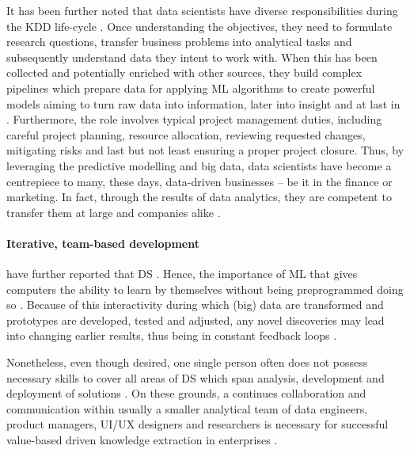 It has been further noted that data scientists have diverse responsibilities during the \ac{KDD} life-cycle \parencite{CaoLong2017}.
Once understanding the objectives, they need to formulate research questions, transfer business problems into analytical tasks and subsequently understand data they intent to work with. 
When this has been collected and potentially enriched with other sources, they build complex pipelines which prepare data for applying \ac{ML} algorithms to create powerful models aiming to turn raw data into information, later into insight and at last in  \parencites{GoebelMichGru1999}[30]{CaoLong2017}.
Furthermore, the role involves typical project management duties, including careful project planning, resource allocation, reviewing requested changes,  mitigating risks and last but not least ensuring a proper project closure.
Thus, by leveraging the predictive modelling and big data, data scientists have become a centrepiece to many, these days, data-driven businesses -- be it in the finance or marketing. 
In fact, through the results of data analytics, they are competent to transfer them  at large and companies alike \parencites{Dhar:2013:DSP:2534706.2500499}[6]{Carbone2016ChallengesPerspective}.

\paragraph*{Iterative, team-based development}
\textcite[705]{Larson2016AScience} have further reported that \ac{DS} .
Hence, the importance of \ac{ML} that gives computers the ability to learn by themselves without being preprogrammed doing so \parencite{IBMMLSamuel1959}.
Because of this interactivity during which (big) data are transformed and prototypes are developed, tested and adjusted, any novel discoveries may lead into changing earlier results, thus being in constant feedback loops \parencite{GoebelMichGru1999}.

Nonetheless, even though desired, one single person often does not possess necessary skills to cover all areas of \ac{DS} which span analysis, development and deployment of solutions \parencite{Carbone2016ChallengesPerspective}. 
On these grounds, a continues collaboration and communication within usually a smaller analytical team of data engineers, product managers, \ac{UI/UX} designers and researchers is necessary for successful value-based driven knowledge extraction in enterprises \parencites{JurneyRus2013}{Domino2017DS}{CarlShan2015TheScientists}. 

